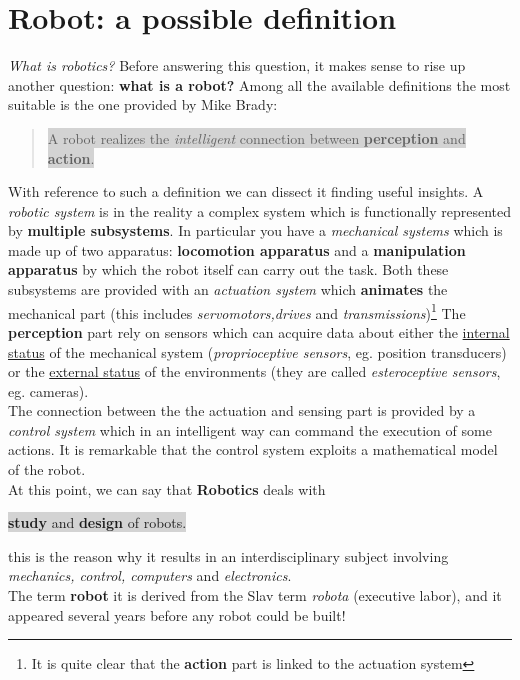 \section{Robot: a possible definition}
\textit{What is robotics?} Before answering this question, it makes sense to rise up another question: \textbf{what is a robot?} Among all the available definitions the most suitable is the one provided by \textsf{Mike Brady}:
\begin{quotation}
    \colorbox{lightgray}{A robot realizes the \textit{intelligent} connection between \textbf{perception} and \textbf{action}.}
\end{quotation}
With reference to such a definition we can dissect it finding useful insights. A \textit{robotic system} is in the reality a complex system which is functionally represented by \textbf{multiple subsystems}. In particular you have a \textit{mechanical systems} which is made up of two apparatus: \textbf{locomotion apparatus} and a \textbf{manipulation apparatus} by which the robot itself can carry out the task. Both these subsystems are provided with an \textit{actuation system} which \textbf{animates} the mechanical part (this includes \textit{servomotors,drives} and \textit{transmissions})\footnote{
    It is quite clear that the \textbf{action} part is linked to the actuation system
}
The \textbf{perception} part rely on sensors which can acquire data about either the \underline{internal status} of the mechanical system (\textit{proprioceptive sensors}, eg. position transducers) or the \underline{external status} of the environments (they are called \textit{esteroceptive sensors}, eg. cameras).\\
The connection between the the actuation and sensing part is provided by a \textit{control system} which in an intelligent way can command the execution of some actions. It is remarkable that the control system exploits a mathematical model of the robot.\\
At this point, we can say that \textbf{Robotics} deals with
\begin{center}
    \Large
    \colorbox{lightgray}{\textbf{study} and \textbf{design} of robots.}
\end{center}
this is the reason why it results in an interdisciplinary subject involving \textit{mechanics, control, computers} and \textit{electronics}.\\
The term \textbf{robot} it is derived from the Slav term \textit{robota} (executive labor), and it appeared several years before any robot could be built!

